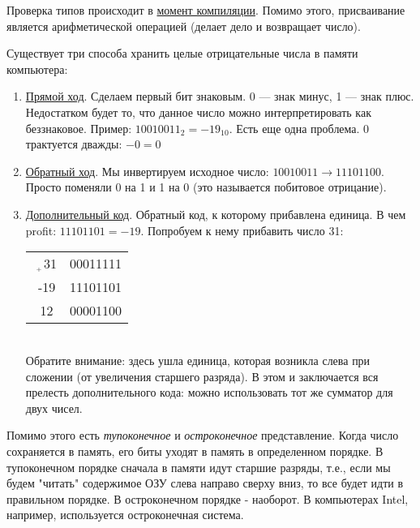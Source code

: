 \begin{lecture}[\lectureSubject]
	\begin{lecSection}
		Проверка типов происходит в \underline{момент компиляции}.
		Помимо этого, присваивание является арифметической операцией (делает дело и возвращает число).
	\end{lecSection}
	\begin{lecSection}
		Существует три способа хранить целые отрицательные числа в памяти компьютера:
		\begin{enumerate}
			\item \underline{Прямой ход}. Сделаем первый бит знаковым. 0 --- знак минус, 1 --- знак плюс. Недостатком будет то, что данное число можно интерпретировать как беззнаковое. Пример:
			$10010011_2 = -19_{10}$. Есть еще одна проблема. 0 трактуется дважды: $-0=0$
			\item \underline{Обратный ход}. Мы инвертируем исходное число: $ 10010011 \rightarrow 11101100$. Просто поменяли 0 на 1 и 1 на 0 (это называется побитовое отрицание).
			\item \underline{Дополнительный код}. Обратный код, к которому прибавлена единица. В чем profit: $11101101 = -19$. Попробуем к нему прибавить число 31: \\
			\begin{tabular}{cc}
				\multicolumn{1}{c|}{$\huge{\,_{\,_{\huge+}}}$31} & 00011111 \\
				\multicolumn{1}{c|}{\,\,-19} & 11101101 \\ \cline{1-2}
				\multicolumn{1}{c|}{\,\,\phantom{-}12} & 00001100
			\end{tabular} \\
			Обратите внимание: здесь ушла единица, которая возникла слева при сложении (от увеличения старшего разряда). В этом и заключается вся прелесть дополнительного кода: можно использовать тот же сумматор для двух чисел. \\
		\end{enumerate}
		Помимо этого есть \textit{тупоконечное} и \textit{остроконечное} представление.
		Когда число сохраняется в память, его биты уходят в память в определенном порядке. В тупоконечном порядке сначала в памяти идут старшие разряды, т.е., если мы будем "читать" содержимое ОЗУ слева направо сверху вниз, то все будет идти в правильном порядке. В остроконечном порядке - наоборот. В компьютерах Intel, например, используется остроконечная система.
		

\end{lecSection}
\end{lecture}
